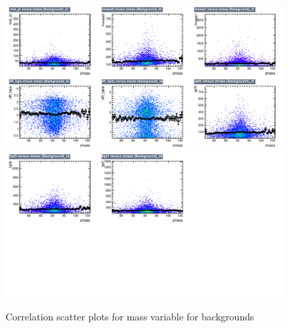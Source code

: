 \begin{figure}[!htb]%
\centering
\includegraphics[width=0.95\textwidth]{figures/CRDY/dataset/plots/correlationscatter_zmass__Id_c3.pdf}
\includegraphics[width=0.95\textwidth]{figures/CRDY/dataset/plots/correlationscatter_zmass__Id_c4.pdf}
\caption{ Correlation scatter plots for \Zll mass variable for backgrounds}%
\label{fig:correlations_CRDY_zmass_BG}                                                       
\end{figure}



